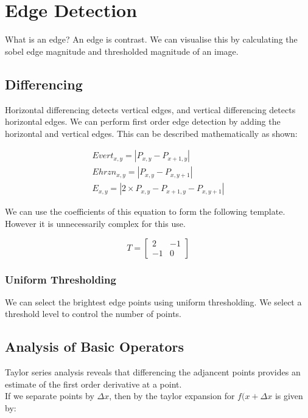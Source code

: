 \section{Edge Detection}

What is an edge? An edge is contrast. We can visualise this by calculating the sobel edge magnitude and thresholded magnitude of an image.

\subsection{Differencing}

Horizontal differencing detects vertical edges, and vertical differencing detects horizontal edges. We can perform first order edge detection by adding the horizontal and vertical edges. This can be described mathematically as shown:

\begin{align}
    Evert_{x,y} = | P_{x,y} - P_{x+1,y} | \\[0.25cm]
    Ehrzn_{x,y} = | P_{x,y} - P_{x,y+1} | \\[0.25cm]
    E_{x,y} = | 2\times P_{x,y} - P_{x+1,y} - P_{x,y+1}|
\end{align}

We can use the coefficients of this equation to form the following template. However it is unnecessarily complex for this use.

\begin{equation}
    T = \begin{bmatrix}
            2 & -1 \\
            -1 & 0
        \end{bmatrix}
\end{equation}

\subsubsection{Uniform Thresholding}
We can select the brightest edge points using uniform thresholding. We select a threshold level to control the number of points.

\subsection{Analysis of Basic Operators}
Taylor series analysis reveals that differencing the adjancent points provides an estimate of the first order derivative at a point.
\\
If we separate points by $\Delta x$, then by the taylor expansion for $f(x+\Delta x$ is given by:

